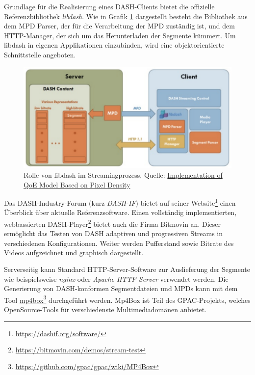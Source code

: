 \documentclass[paper = a4, fontsize = 12pt, parskip = half]{scrartcl} %
\begin{document}
Grundlage für die Realisierung eines DASH-Clients bietet die offizielle Referenzbibliothek \textit{libdash}. Wie in Grafik \ref{libdash_embedded} dargestellt besteht die Bibliothek aus dem MPD Parser, der für die Verarbeitung der MPD zuständig ist, und dem HTTP-Manager, der sich um das Herunterladen der Segmente kümmert. Um libdash in eigenen Applikationen einzubinden, wird eine objektorientierte Schnittstelle angeboten.

\begin{center}
	\begin{figure}[ht]
		\centering
		\includegraphics[width=12cm]{images/libdash_embedded.png}
		\caption{Rolle von libdash im Streamingprozess, Quelle: \hyperref{https://doi.org/10.1109/CAIS.2019.8769444}{}{}{Implementation of QoE Model Based on Pixel Density}}
		\label{libdash_embedded}
	\end{figure}
\end{center}

Das DASH-Industry-Forum (kurz \textit{DASH-IF}) bietet auf seiner Website\footnote{\url{https://dashif.org/software/}} einen Überblick über aktuelle Referenzsoftware. Einen vollständig implementierten, webbassierten DASH-Player\footnote{\url{https://bitmovin.com/demos/stream-test}} bietet auch die Firma Bitmovin an. Dieser ermöglicht das Testen von DASH adaptiven und progressiven Streams in verschiedenen Konfigurationen. Weiter werden Pufferstand sowie Bitrate des Videos aufgzeichnet und graphisch dargestellt.

Serverseitig kann Standard HTTP-Server-Software zur Auslieferung der Segmente wie beispielsweise \textit{nginx} oder \textit{Apache HTTP Server} verwendet werden. Die Generierung von DASH-konformen Segmentdateien und MPDs kann mit dem Tool \hyperref{https://github.com/gpac/gpac}{}{}{mp4box}\footnote{\url{https://github.com/gpac/gpac/wiki/MP4Box}} durchgeführt werden. Mp4Box ist Teil des GPAC-Projekts, welches OpenSource-Tools für verschiedenste Multimediadomänen anbietet.
\end{document}
